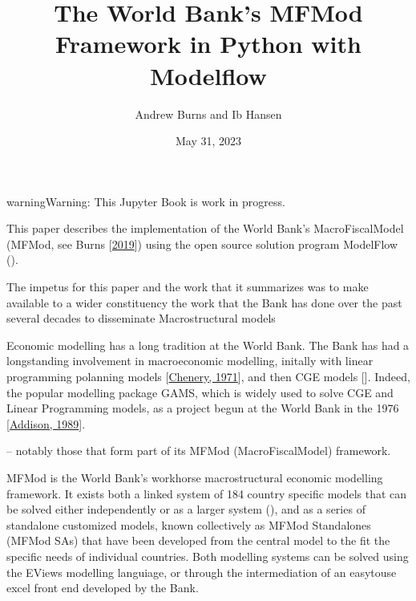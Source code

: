 \documentclass[letterpaper,10pt,english]{jupyterBook}
\title{The World Bank's MFMod Framework in Python with Modelflow}
\date{May 31, 2023}
\author{Andrew Burns and Ib Hansen}
\begin{document}
\pagestyle{empty}
\sphinxmaketitle
\pagestyle{plain}
\sphinxtableofcontents
\pagestyle{normal}
\label{\detokenize{content/Introduction::doc}}


\begin{sphinxadmonition}{warning}{Warning:}
\sphinxAtStartPar
This Jupyter Book is work in progress.
\end{sphinxadmonition}

\sphinxAtStartPar
This paper describes the implementation of the World Bank’s MacroFiscalModel (MFMod, see Burns  {[}\hyperlink{cite.content/99_BackMatter/References:id15}{2019}{]}) using the open source solution program ModelFlow ().

\sphinxAtStartPar
The impetus for this paper and the work that it summarizes was to make available to a wider constituency the work that the Bank has done over the past several decades to disseminate Macro\sphinxhyphen{}structural models%
\begin{footnote}[1]\sphinxAtStartFootnote
Economic modelling has a long tradition at the World Bank.  The Bank has had a long\sphinxhyphen{}standing involvement in macroeconomic modelling, initally with linear programming polanning models {[}\hyperlink{cite.content/99_BackMatter/References:id21}{Chenery, 1971}{]}, and then CGE models {[}{]}. Indeed, the popular modelling package GAMS, which is widely used to solve CGE and Linear Programming models,  as a project begun at the World Bank in the 1976 {[}\hyperlink{cite.content/99_BackMatter/References:id20}{Addison, 1989}{]}.
%
\end{footnote} – notably those that form part of its MFMod (MacroFiscalModel) framework.

\begin{DUlineblock}{0em}
\item[] 
\end{DUlineblock}

\sphinxAtStartPar
MFMod is the World Bank’s work\sphinxhyphen{}horse macro\sphinxhyphen{}structural economic modelling framework. It exists both a linked system of 184 country specific models that can be solved either independently or as a larger system (), and as a series of  standalone customized models, known collectively as MFMod Standalones (MFMod SAs) that have been developed from the central model to the fit the specific needs of individual countries. Both modelling systems can be solved using the EViews modelling languiage, or through the intermediation of an easy\sphinxhyphen{}to\sphinxhyphen{}use excel front end developed by the Bank.
\end{document}
